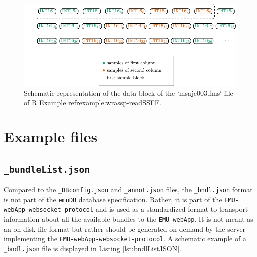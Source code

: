 \documentclass[]{book}
\theoremstyle{definition}
\theoremstyle{definition}
\theoremstyle{definition}
\theoremstyle{remark}
\begin{document}
\begin{figure}

{\centering \includegraphics[width=1\linewidth]{pics/ssffDataBlock} 

}

\caption{Schematic representation of the data block of the `msajc003.fms` file of R Example ref{rexample:wrassp-readSSFF}.}\label{fig:wrassp-ssffDataBlock}
\end{figure}

\hypertarget{example-files}{%
\section{Example files}\label{example-files}}

\hypertarget{subsec:app-chapExampleFilesBundleList}{%
\subsection{\texorpdfstring{\texttt{\_bundleList.json}}{\_bundleList.json}}\label{subsec:app-chapExampleFilesBundleList}}

Compared to the \texttt{\_DBconfig.json} and \texttt{\_annot.json}
files, the \texttt{\_bndl.json} format is not part of the \texttt{emuDB}
database specification. Rather, it is part of the
\texttt{EMU-webApp-websocket-protocol} and is used as a standardized
format to transport information about all the available bundles to the
\texttt{EMU-webApp}. It is not meant as an on-disk file format but
rather should be generated on-demand by the server implementing the
\texttt{EMU-webApp-websocket-protocol}. A schematic example of a
\texttt{\_bndl.json} file is displayed in Listing
\ref{lst:bndlListJSON}.
\end{document}
